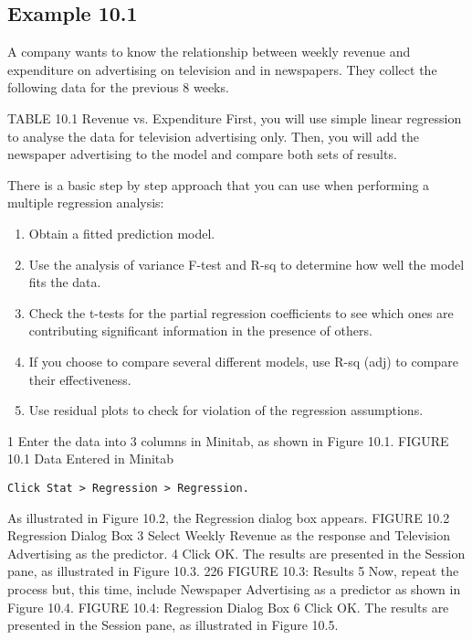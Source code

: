 \documentclass[]{report}
\begin{document}
\subsection{Example 10.1}
A company wants to know the relationship between weekly revenue and expenditure
on advertising on television and in newspapers. They collect the following data for the
previous 8 weeks.

TABLE 10.1 Revenue vs. Expenditure
First, you will use simple linear regression to analyse the data for television advertising
only. Then, you will add the newspaper advertising to the model and compare both sets
of results.

There is a basic step by step approach that you can use when performing
a multiple regression analysis:
\begin{enumerate}
\item Obtain a fitted prediction model.
\item Use the analysis of variance F-test and R-sq to determine how
well the model fits the data.
\item Check the t-tests for the partial regression coefficients to see
which ones are contributing significant information in the
presence of others.
\item If you choose to compare several different models, use R-sq
(adj) to compare their effectiveness.
\item Use residual plots to check for violation of the regression
assumptions.
\end{enumerate}
1 Enter the data into 3 columns in Minitab, as shown in Figure 10.1.
FIGURE 10.1 Data Entered in Minitab
\begin{verbatim}
Click Stat > Regression > Regression. 
\end{verbatim}
As illustrated in Figure 10.2, the
Regression dialog box appears.
FIGURE 10.2 Regression Dialog Box
3 Select Weekly Revenue as the response and Television Advertising as the
predictor.
4 Click OK. The results are presented in the Session pane, as illustrated in Figure
10.3.
226
FIGURE 10.3: Results
5 Now, repeat the process but, this time, include Newspaper Advertising as a
predictor as shown in Figure 10.4.
FIGURE 10.4: Regression Dialog Box
6 Click OK. The results are presented in the Session pane, as illustrated in Figure
10.5.
\end{document}
